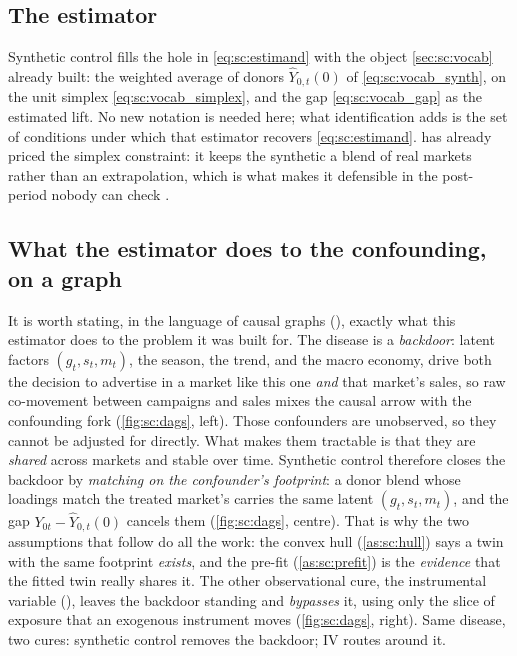 \subsection*{The estimator}

Synthetic control fills the hole in \cref{eq:sc:estimand} with the object \cref{sec:sc:vocab} already
built: the weighted average of donors $\widehat{Y}_{0,t}(0)$ of \cref{eq:sc:vocab_synth}, on the unit
simplex \cref{eq:sc:vocab_simplex}, and the gap \cref{eq:sc:vocab_gap} as the estimated lift. No new
notation is needed here; what identification adds is the set of conditions under which that estimator
recovers \cref{eq:sc:estimand}.  has already priced the simplex constraint: it
keeps the synthetic a blend of real markets rather than an extrapolation, which is what makes it
defensible in the post-period nobody can check \citep{abadie2010, abadie2021}.

\subsection*{What the estimator does to the confounding, on a graph}

It is worth stating, in the language of causal graphs (), exactly what this
estimator does to the problem it was built for. The disease is a \emph{backdoor}: latent factors
$(g_t, s_t, m_t)$, the season, the trend, and the macro economy, drive both the decision to
advertise in a market like this one \emph{and} that market's sales, so raw co-movement between
campaigns and sales mixes the causal arrow with the confounding fork
(\cref{fig:sc:dags}, left). Those confounders are unobserved, so they cannot be adjusted for
directly. What makes them tractable is that they are \emph{shared} across markets and stable over
time. Synthetic control therefore closes the backdoor by \emph{matching on the confounder's
footprint}: a donor blend whose loadings match the treated market's carries the same latent
$(g_t, s_t, m_t)$, and the gap $Y_{0t} - \widehat{Y}_{0,t}(0)$ cancels them
(\cref{fig:sc:dags}, centre). That is why the two assumptions that follow do all the work: the
convex hull (\cref{as:sc:hull}) says a twin with the same footprint \emph{exists}, and the pre-fit
(\cref{as:sc:prefit}) is the \emph{evidence} that the fitted twin really shares it. The other
observational cure, the instrumental variable (), leaves the backdoor standing and
\emph{bypasses} it, using only the slice of exposure that an exogenous instrument moves
(\cref{fig:sc:dags}, right). Same disease, two cures: synthetic control removes the backdoor; IV
routes around it.

